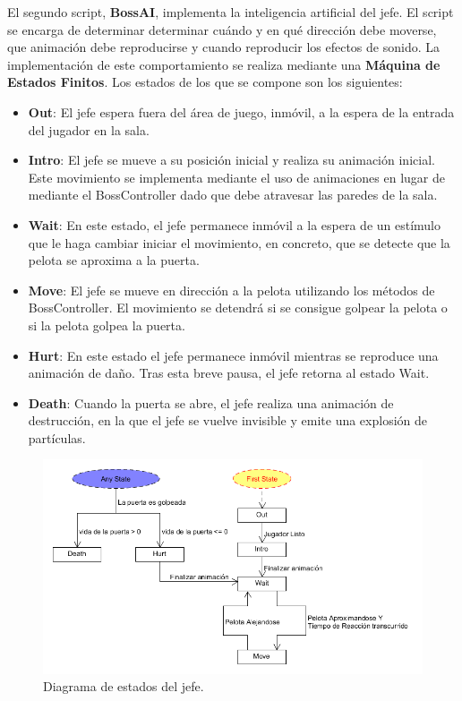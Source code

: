 El segundo script, \textbf{BossAI}, implementa la inteligencia artificial del jefe. El script se encarga de determinar determinar cuándo y en qué dirección debe moverse, que animación debe reproducirse y cuando reproducir los efectos de sonido. La implementación de este comportamiento se realiza mediante una \textbf{Máquina de Estados Finitos}. Los estados de los que se compone son los siguientes:
 \begin{itemize}
	\item \textbf{Out}: El jefe espera fuera del área de juego, inmóvil, a la espera de la entrada del jugador en la sala.
	\item \textbf{Intro}: El jefe se mueve a su posición inicial y realiza su animación inicial. Este movimiento se implementa mediante el uso de animaciones en lugar de mediante el BossController dado que debe atravesar las paredes de la sala.
	\item \textbf{Wait}: En este estado, el jefe permanece inmóvil a la espera de un estímulo que le haga cambiar iniciar el movimiento, en concreto, que se detecte que la pelota se aproxima a la puerta.
	\item \textbf{Move}: El jefe se mueve en dirección a la pelota utilizando los métodos de BossController. El movimiento se detendrá si se consigue golpear la pelota o si la pelota golpea la puerta. 
	\item \textbf{Hurt}: En este estado el jefe permanece inmóvil mientras se reproduce una animación de daño. Tras esta breve pausa, el jefe retorna al estado Wait.
	\item \textbf{Death}: Cuando la puerta se abre, el jefe realiza una animación de destrucción, en la que el jefe se vuelve invisible y emite una explosión de partículas. 
\end{itemize}

\begin{figure}[h]
	\includegraphics[width=1\textwidth]{images/estructura/jefe/boss-estados}
	\centering
	\caption{Diagrama de estados del jefe.}
\end{figure}
